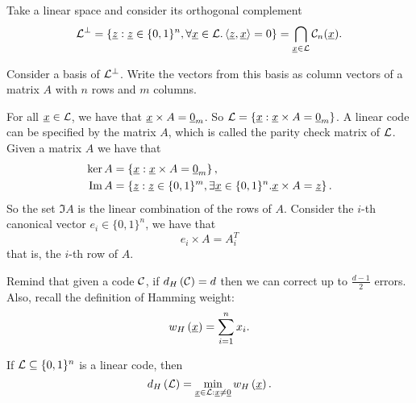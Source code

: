 Take a linear space and consider its orthogonal complement
\begin{equation*}
	\mathcal{L}^\perp = \left\{
		\underline{z} : \underline{z} \in \{0, 1\}^n, \forall \underline{x} \in \mathcal{L} . \left< {\underline{z}}, {\underline{x}} \right> = 0
	\right\}
	=
	\bigcap_{\underline{x} \in \mathcal{L}} \mathcal{C}_n(\underline{x}).
\end{equation*}

Consider a basis of $\mathcal{L}^\perp$.
Write the vectors from this basis as column vectors of a matrix $A$ with $n$ rows and $m$ columns.

For all $\underline{x} \in \mathcal{L}$, we have that $\underline{x} \times A = \underline{0}_m$.
So $\mathcal{L} = \left\{ \underline{x} : \underline{x} \times A = \underline{0}_m \right\}$.
A linear code can be specified by the matrix $A$, which is called the parity check matrix of $\mathcal{L}$.
Given a matrix $A$ we have that
\begin{align*}
	\ker A & = \left\{ \underline{x} : \underline{x} \times A = \underline{0}_m \right\},
	\\
	\operatorname{Im} A & = \left\{ \underline{z} : \underline{z} \in \{0, 1\}^m, \exists \underline{x} \in \{0, 1\}^n . \underline{x} \times A = \underline{z} \right\}.
\end{align*}
So the set $\Im A$ is the linear combination of the rows of $A$.
Consider the $i$-th canonical vector $e_i \in \{0, 1\}^n$, we have that
\begin{equation*}
	e_i \times A = A_i^T
\end{equation*}
that is, the $i$-th row of $A$.

Remind that given a code $\mathcal{C}$, if $d_H \left({\mathcal{C}}\right) = d$ then we can correct up to $\frac{d-1}{2}$ errors.
Also, recall the definition of Hamming weight:
\begin{equation*}
	w_H\left(\underline{x}\right) = \sum_{i = 1}^n x_i.
\end{equation*}

\begin{obs}
	If $\mathcal{L} \subseteq \{0, 1\}^n$ is a linear code, then
	\begin{equation*}
		d_H \left({\mathcal{L}}\right) = \min_{\underline{x} \in \mathcal{L} : \underline{x} \neq \underline{0}} w_H\left(\underline{x}\right).
	\end{equation*}
\end{obs}

